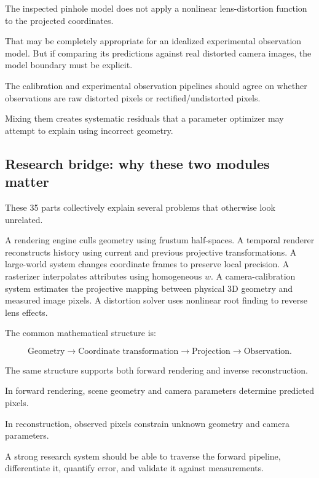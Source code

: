 The inspected pinhole model does not apply a nonlinear lens-distortion function to the projected coordinates.

That may be completely appropriate for an idealized experimental observation model. But if comparing its predictions against real distorted camera images, the model boundary must be explicit.

The calibration and experimental observation pipelines should agree on whether observations are raw distorted pixels or rectified/undistorted pixels.

Mixing them creates systematic residuals that a parameter optimizer may attempt to explain using incorrect geometry.

\subsection{Research bridge: why these two modules matter}\label{02-foundations-ii-ch037-research-bridge-why-these-two-modules-matter}

\hypertarget{02-foundations-ii-ch037-research-bridge-why-these-two-modules-matter}{}

These 35 parts collectively explain several problems that otherwise look unrelated.

A rendering engine culls geometry using frustum half-spaces. A temporal renderer reconstructs history using current and previous projective transformations. A large-world system changes coordinate frames to preserve local precision. A rasterizer interpolates attributes using homogeneous \(w\). A camera-calibration system estimates the projective mapping between physical 3D geometry and measured image pixels. A distortion solver uses nonlinear root finding to reverse lens effects.

The common mathematical structure is:

\[
 \boxed{ \text{Geometry} \rightarrow \text{Coordinate transformation} \rightarrow \text{Projection} \rightarrow \text{Observation} }.
\]

The same structure supports both forward rendering and inverse reconstruction.

In forward rendering, scene geometry and camera parameters determine predicted pixels.

In reconstruction, observed pixels constrain unknown geometry and camera parameters.

A strong research system should be able to traverse the forward pipeline, differentiate it, quantify error, and validate it against measurements.

